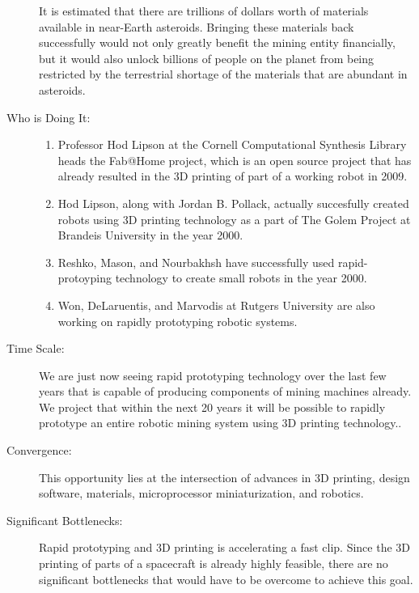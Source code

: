 \begin{description}
It is estimated that there are trillions of dollars worth of materials
available in near-Earth asteroids. Bringing these materials back successfully
would not only greatly benefit the mining entity financially, but
it would also unlock billions of people on the planet from being restricted
by the terrestrial shortage of the materials that are abundant in
asteroids.


\item[Who is Doing It:]

\hfill\begin{enumerate}
\item Professor Hod Lipson at the Cornell Computational Synthesis Library
heads the Fab@Home project, which is an open source project that has
already resulted in the 3D printing of part of a working robot in
2009\cite{fabathome}.
\item Hod Lipson, along with Jordan B. Pollack, actually succesfully created
robots using 3D printing technology as a part of The Golem Project
at Brandeis University in the year 2000\cite{golem}.
\item Reshko, Mason, and Nourbakhsh have successfully used rapid-protoyping
technology to create small robots in the year 2000\cite{reshko}.
\item Won, DeLaruentis, and Marvodis at Rutgers University are also working
on rapidly prototyping robotic systems\cite{won}.
\end{enumerate}

\item[Time Scale:]

We are just now seeing rapid prototyping technology over the last
few years that is capable of producing components of mining machines
already. We project that within the next 20 years it will be possible
to rapidly prototype an entire robotic mining system using 3D printing
technology..


\item[Convergence:]

This opportunity lies at the intersection of advances in 3D printing,
design software, materials, microprocessor miniaturization, and robotics.


\item[Significant Bottlenecks:]

Rapid prototyping and 3D printing is accelerating a fast clip. Since
the 3D printing of parts of a spacecraft is already highly feasible,
there are no significant bottlenecks that would have to be overcome
to achieve this goal.
\end{description}
 
